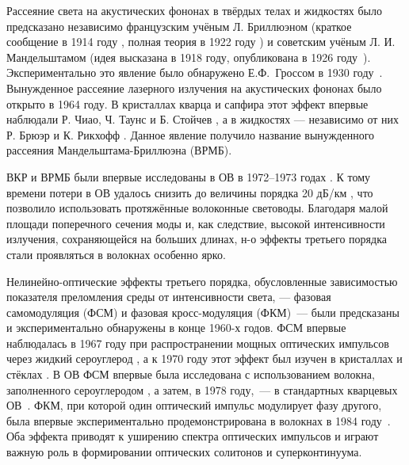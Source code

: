 Рассеяние света на акустических фононах в твёрдых телах и жидкостях было предсказано независимо французским учёным Л. Бриллюэном (краткое сообщение в 1914 году \cite{brillouin1914}, полная теория в 1922 году \cite{brillouin1922}) и советским учёным Л. И. Мандельштамом (идея высказана в 1918 году, опубликована в 1926 году~\cite{mandelstam1926}). Экспериментально это явление было обнаружено Е.Ф.~Гроссом в 1930 году~\cite{gross1930}. Вынужденное рассеяние лазерного излучения на акустических фононах было открыто в 1964 году. В кристаллах кварца и сапфира этот эффект впервые наблюдали Р. Чиао, Ч. Таунс и Б. Стойчев \cite{chiao1964stimulated}, а в жидкостях — независимо от них Р. Брюэр и К. Рикхофф \cite{brewer1964stimulated}. Данное явление получило название вынужденного рассеяния Мандельштама-Бриллюэна (ВРМБ).

ВКР и ВРМБ были впервые исследованы в ОВ в 1972–1973 годах \cite{smith1972optical, ippen1972stimulated, stolen1973raman}. К тому времени потери в ОВ удалось снизить до величины порядка 20 дБ/км \cite{kapron1970radiation}, что позволило использовать протяжённые волоконные световоды. Благодаря малой площади поперечного сечения моды и, как следствие, высокой интенсивности излучения, сохраняющейся на больших длинах, н-о эффекты третьего порядка стали проявляться в волокнах особенно ярко.

Нелинейно-оптические эффекты третьего порядка, обусловленные зависимостью показателя преломления среды от интенсивности света, — фазовая самомодуляция (ФСМ) и фазовая кросс-модуляция (ФКМ)~--- были предсказаны и экспериментально обнаружены в конце 1960-х годов. ФСМ впервые наблюдалась в 1967 году при распространении мощных оптических импульсов через жидкий сероуглерод \cite{shimizu1967frequency}, а к 1970 году этот эффект был изучен в кристаллах и стёклах \cite{alfano1970observation}. В ОВ ФСМ впервые была исследована с использованием волокна, заполненного сероуглеродом \cite{ippen1974self}, а затем, в 1978 году,~--- в стандартных кварцевых ОВ~\cite{stolen1978self}. ФКМ, при которой один оптический импульс модулирует фазу другого, была впервые экспериментально продемонстрирована в волокнах в 1984 году~\cite{chraplyvy1984measurement}. Оба эффекта приводят к уширению спектра оптических импульсов и играют важную роль в формировании оптических солитонов и суперконтинуума.



